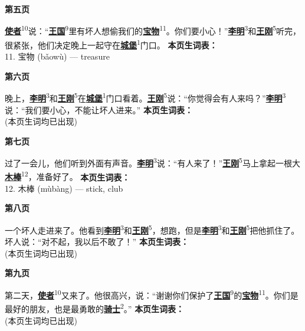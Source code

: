 \documentclass[20pt]{extarticle}
\newcommand{\glossedword}[2]{\uline{\textbf{#1}}\textsuperscript{#2}}
\begin{document}
\begin{center}
    {\fontsize{36}{44}\selectfont \textbf{第五页}}
\end{center}
\vspace{2em}
{\fontsize{22}{30}\selectfont
\noindent
\glossedword{使者}{10}说：“\glossedword{王国}{9}里有坏人想偷我们的\glossedword{宝物}{11}。你们要小心！”\glossedword{李明}{3}和\glossedword{王刚}{5}听完，很紧张，他们决定晚上一起守在\glossedword{城堡}{1}门口。
}
\vfill
{\fontsize{18}{26}\selectfont
\noindent
\textbf{本页生词表：}\\[0.5em]
11. 宝物 (bǎowù) — treasure
}
\newpage

\begin{center}
    {\fontsize{36}{44}\selectfont \textbf{第六页}}
\end{center}
\vspace{2em}
{\fontsize{22}{30}\selectfont
\noindent
晚上，\glossedword{李明}{3}和\glossedword{王刚}{5}在\glossedword{城堡}{1}门口看着。\glossedword{王刚}{5}说：“你觉得会有人来吗？”\glossedword{李明}{3}说：“我们要小心，不能让坏人进来。”
}
\vfill
{\fontsize{18}{26}\selectfont
\noindent
\textbf{本页生词表：}\\[0.5em]
(本页生词均已出现)
}
\newpage

\begin{center}
    {\fontsize{36}{44}\selectfont \textbf{第七页}}
\end{center}
\vspace{2em}
{\fontsize{22}{30}\selectfont
\noindent
过了一会儿，他们听到外面有声音。\glossedword{李明}{3}说：“有人来了！”\glossedword{王刚}{5}马上拿起一根大\glossedword{木棒}{12}，准备好了。
}
\vfill
{\fontsize{18}{26}\selectfont
\noindent
\textbf{本页生词表：}\\[0.5em]
12. 木棒 (mùbàng) — stick, club
}
\newpage

\begin{center}
    {\fontsize{36}{44}\selectfont \textbf{第八页}}
\end{center}
\vspace{2em}
{\fontsize{22}{30}\selectfont
\noindent
一个坏人走进来了。他看到\glossedword{李明}{3}和\glossedword{王刚}{5}，想跑，但是\glossedword{李明}{3}和\glossedword{王刚}{5}把他抓住了。坏人说：“对不起，我以后不敢了！”
}
\vfill
{\fontsize{18}{26}\selectfont
\noindent
\textbf{本页生词表：}\\[0.5em]
(本页生词均已出现)
}
\newpage

\begin{center}
    {\fontsize{36}{44}\selectfont \textbf{第九页}}
\end{center}
\vspace{2em}
{\fontsize{22}{30}\selectfont
\noindent
第二天，\glossedword{使者}{10}又来了。他很高兴，说：“谢谢你们保护了\glossedword{王国}{9}的\glossedword{宝物}{11}。你们是最好的朋友，也是最勇敢的\glossedword{骑士}{2}。”
}
\vfill
{\fontsize{18}{26}\selectfont
\noindent
\textbf{本页生词表：}\\[0.5em]
(本页生词均已出现)
}
\newpage
\end{document}
